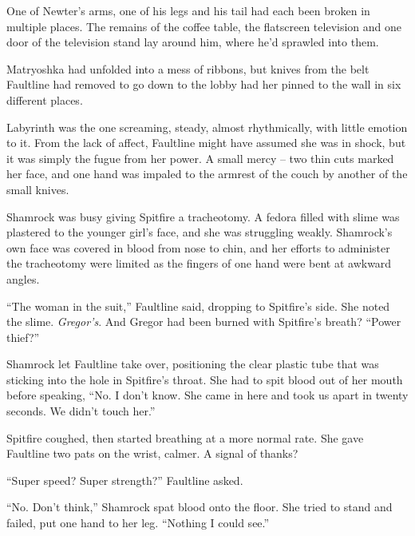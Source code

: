 One of Newter's arms, one of his legs and his tail had each been broken in multiple places.  The remains of the coffee table, the flatscreen television and one door of the television stand lay around him, where he'd sprawled into them.



Matryoshka had unfolded into a mess of ribbons, but knives from the belt Faultline had removed to go down to the lobby had her pinned to the wall in six different places.



Labyrinth was the one screaming, steady, almost rhythmically, with little emotion to it.  From the lack of affect, Faultline might have assumed she was in shock, but it was simply the fugue from her power.  A small mercy – two thin cuts marked her face, and one hand was impaled to the armrest of the couch by another of the small knives.



Shamrock was busy giving Spitfire a tracheotomy.  A fedora filled with slime was plastered to the younger girl's face, and she was struggling weakly.  Shamrock's own face was covered in blood from nose to chin, and her efforts to administer the tracheotomy were limited as the fingers of one hand were bent at awkward angles.



``The woman in the suit,'' Faultline said, dropping to Spitfire's side.  She noted the slime.  \emph{Gregor's}.  And Gregor had been burned with Spitfire's breath?  ``Power thief?''



Shamrock let Faultline take over, positioning the clear plastic tube that was sticking into the hole in Spitfire's throat.  She had to spit blood out of her mouth before speaking, ``No.  I don't know.  She came in here and took us apart in twenty seconds.  We didn't touch her.''



Spitfire coughed, then started breathing at a more normal rate.  She gave Faultline two pats on the wrist, calmer.  A signal of thanks?



``Super speed?  Super strength?''  Faultline asked.



``No.  Don't think,'' Shamrock spat blood onto the floor.  She tried to stand and failed, put one hand to her leg.  ``Nothing I could see.''



